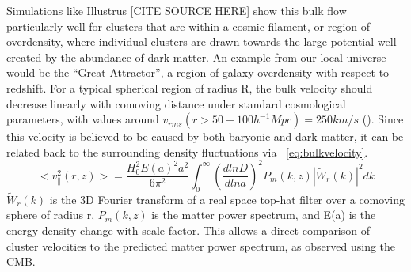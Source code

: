 \documentclass[manuscript]{aastex}
\begin{document}
Simulations like Illustrus [CITE SOURCE HERE] show this bulk flow particularly well for clusters that are within a cosmic filament, or region of overdensity, where individual clusters are drawn towards the large potential well created by the abundance of dark matter. An example from our local universe would be the ``Great Attractor'', a region of galaxy overdensity with respect to redshift. For a typical spherical region of radius R, the bulk velocity should decrease linearly with comoving distance under standard cosmological parameters, with values around \(v_{rms}(r > 50-100  h^{-1} Mpc) = 250 km/s\) (\cite{Mak2011}). Since this velocity is believed to be caused by both baryonic and dark matter, it can be related back to the surrounding density fluctuations via ~\ref{eq:bulkvelocity}. 
\begin{equation}\label{eq:bulkvelocity}
 <v^{2}_{\parallel}(r,z)> = \frac{H_{0}^{2}E(a)^{2}a^{2}}{6\pi^{2}} \int_{0}^{\infty} (\frac{d ln D}{d ln a})^{2} P_{m}(k,z)|\tilde{W}_{r}(k)|^{2} dk
 \end{equation}
\(\tilde{W}_{r}(k)\) is the 3D Fourier transform of a real space top-hat filter over a comoving sphere of radius r, \(P_{m}(k,z)\) is the matter power spectrum, and E(a) is the energy density change with scale factor. This allows a direct comparison of cluster velocities to the predicted matter power spectrum, as observed using the CMB.




\end{document}
